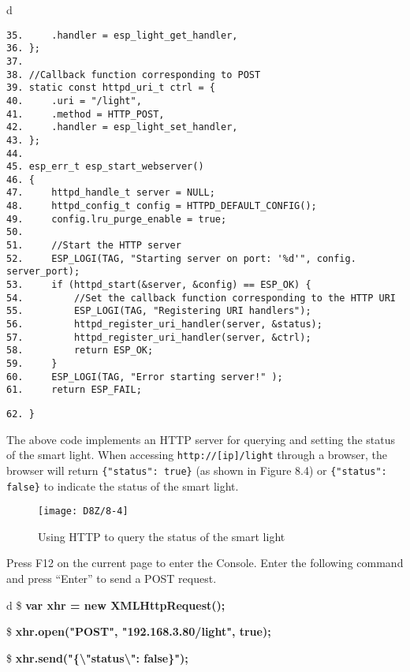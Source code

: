 \documentclass[a4paper,12pt]{book}
\begin{document}
\begin{codebloc}
\begin{tabular}{d}
\vspace{2pt}
\begin{verbatim}
35.     .handler = esp_light_get_handler,
36. };
37.	
38. //Callback function corresponding to POST
39. static const httpd_uri_t ctrl = {
40.     .uri = "/light",
41.     .method = HTTP_POST,
42.     .handler = esp_light_set_handler,
43. };
44.	
45. esp_err_t esp_start_webserver()
46. {
47.     httpd_handle_t server = NULL;
48.     httpd_config_t config = HTTPD_DEFAULT_CONFIG();
49.     config.lru_purge_enable = true;
50.	
51.     //Start the HTTP server
52.     ESP_LOGI(TAG, "Starting server on port: '%d'", config. server_port);
53.     if (httpd_start(&server, &config) == ESP_OK) {
54.         //Set the callback function corresponding to the HTTP URI
55.         ESP_LOGI(TAG, "Registering URI handlers");
56.         httpd_register_uri_handler(server, &status);
57.         httpd_register_uri_handler(server, &ctrl);
58.         return ESP_OK;
59.     }
60.     ESP_LOGI(TAG, "Error starting server!" );
61.     return ESP_FAIL;
\end{verbatim}
\verb|62. }|
\end{tabular}
\end{codebloc}

The above code implements an HTTP server for querying and setting the status of the smart light. When accessing \verb|http://[ip]/light| through a browser, the browser will return \verb|{"status": true}| (as shown in Figure 8.4) or \verb|{"status": false}| to indicate the status of the smart light.

\begin{figure}[!h]
    \centering
    \texttt{[image: D8Z/8-4]}
    \caption{Using HTTP to query the status of the smart light}
\end{figure}

Press F12 on the current page to enter the Console. Enter the following command and press “Enter” to send a POST request.

\begin{codebloc}
\begin{tabular}{d}
\$ \textbf{var xhr = new XMLHttpRequest();}

\$ \textbf{xhr.open("POST", "192.168.3.80/light", true);}

\$ \textbf{xhr.send("\{\textbackslash"status\textbackslash": false\}");}
\end{tabular}
\end{codebloc}
\end{document}

